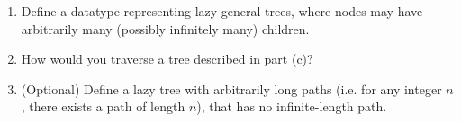 \documentclass[11pt,a4paper]{article}
\begin{document}
\begin{enumerate}
\begin{enumerate}
    \item Define a datatype representing lazy general trees, where nodes may have arbitrarily many (possibly infinitely many) children.

    \item How would you traverse a tree described in part (c)?

    \item (Optional) Define a lazy tree with arbitrarily long paths (i.e. for any integer $n$, there exists a path of length $n$), that has no infinite-length path.
\end{enumerate}

\end{enumerate}
\end{document}
